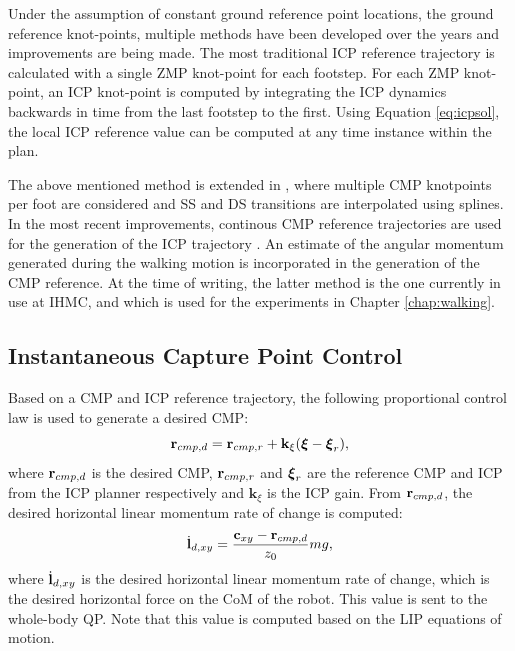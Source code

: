 Under the assumption of constant ground reference point locations, the ground reference knot-points, multiple methods have been developed over the years and improvements are being made. The most traditional \ac{ICP} reference trajectory is calculated with a single \ac{ZMP} knot-point \cite{englsberger2012integration} for each footstep. For each \ac{ZMP} knot-point, an \ac{ICP} knot-point is computed by integrating the \ac{ICP} dynamics backwards in time from the last footstep to the first. Using Equation \eqref{eq:icpsol}, the local \ac{ICP} reference value can be computed at any time instance within the plan. 

The above mentioned method is extended in \cite{englsberger2014trajectory}, where multiple \ac{CMP} knotpoints per foot are considered and \ac{SS} and \ac{DS} transitions are interpolated using splines. In the most recent improvements, continous \ac{CMP} reference trajectories are used for the generation of the \ac{ICP} trajectory \cite{seyde2018inclusion}. An estimate of the angular momentum generated during the walking motion is incorporated in the generation of the \ac{CMP} reference. At the time of writing, the latter method is the one currently in use at \ac{IHMC}, and which is used for the experiments in Chapter \ref{chap:walking}.
\subsection{Instantaneous Capture Point Control}\label{sec:icpcontrol}
Based on a \ac{CMP} and \ac{ICP} reference trajectory, the following proportional control law is used to generate a desired \ac{CMP}:
\begin{equation}
    \mathbf{r}_{cmp,d}=\mathbf{r}_{cmp,r} + \mathbf{k}_{\xi}(\boldsymbol{\xi}-\boldsymbol{\xi}_r),
    \label{eq:rcmpd}
\end{equation}
where $\mathbf{r}_{cmp,d}$ is the desired \ac{CMP}, $\mathbf{r}_{cmp,r}$ and $\boldsymbol{\xi}_r$ are the reference \ac{CMP} and \ac{ICP} from the \ac{ICP} planner respectively and $\mathbf{k}_{\xi}$ is the \ac{ICP} gain. From $\mathbf{r}_{cmp,d}$, the desired horizontal linear momentum rate of change is computed:
\begin{equation}\label{eq:dotldxy}
    \dot{\mathbf{l}}_{d,xy} = \frac{\mathbf{c}_{xy}-\mathbf{r}_{cmp,d}}{z_0}mg,
\end{equation}
where $\dot{\mathbf{l}}_{d,xy}$ is the desired horizontal linear momentum rate of change, which is the desired horizontal force on the \ac{CoM} of the robot. This value is sent to the whole-body \ac{QP}. Note that this value is computed based on the \ac{LIP} equations of motion. 

